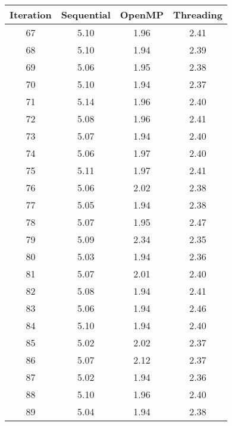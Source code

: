 \documentclass[a4paper]{article}
\begin{document}
        \begin{minipage}{\textwidth}
            \centering
            \begin{tabular}{ c c c c }
                Iteration & Sequential & OpenMP & Threading \\
                \hline
                \hline
                       67 &       5.10 &   1.96 &      2.41 \\
                       68 &       5.10 &   1.94 &      2.39 \\
                       69 &       5.06 &   1.95 &      2.38 \\
                       70 &       5.10 &   1.94 &      2.37 \\
                       71 &       5.14 &   1.96 &      2.40 \\
                       72 &       5.08 &   1.96 &      2.41 \\
                       73 &       5.07 &   1.94 &      2.40 \\
                       74 &       5.06 &   1.97 &      2.40 \\
                       75 &       5.11 &   1.97 &      2.41 \\
                       76 &       5.06 &   2.02 &      2.38 \\
                       77 &       5.05 &   1.94 &      2.38 \\
                       78 &       5.07 &   1.95 &      2.47 \\
                       79 &       5.09 &   2.34 &      2.35 \\
                       80 &       5.03 &   1.94 &      2.36 \\
                       81 &       5.07 &   2.01 &      2.40 \\
                       82 &       5.08 &   1.94 &      2.41 \\
                       83 &       5.06 &   1.94 &      2.46 \\
                       84 &       5.10 &   1.94 &      2.40 \\
                       85 &       5.02 &   2.02 &      2.37 \\
                       86 &       5.07 &   2.12 &      2.37 \\
                       87 &       5.02 &   1.94 &      2.36 \\
                       88 &       5.10 &   1.96 &      2.40 \\
                       89 &       5.04 &   1.94 &      2.38 \\

\end{tabular}
\end{minipage}
\end{document}
